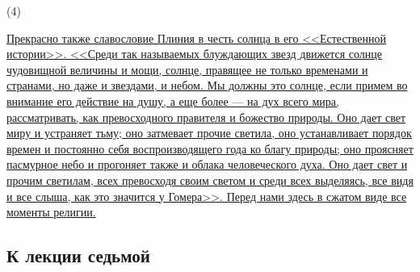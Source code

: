 \documentclass[12pt]{article}
\begin{document}
\hypertarget{4}{(4)} \hyperlink{b4}{Прекрасно также славословие Плиния в честь солнца в его <<Естественной истории>>. <<Среди так называемых блуждающих звезд движется солнце чудовищной величины и мощи, солнце, правящее не только временами и странами, но даже и звездами, и небом. Мы должны это солнце, если примем во внимание его действие на душу, а еще более --- на дух всего мира, рассматривать, как превосходного правителя и божество природы. Оно дает свет миру и устраняет тьму; оно затмевает прочие светила, оно устанавливает порядок времен и постоянно себя воспроизводящего года ко благу природы; оно проясняет пасмурное небо и прогоняет также и облака человеческого духа. Оно дает свет и прочим светилам, всех превосходя своим светом и среди всех выделяясь, все видя и все слыша, как это значится у Гомера>>. Перед нами здесь в сжатом виде все моменты религии.} 

{}
\subsection*{К лекции седьмой} 
\end{document}
